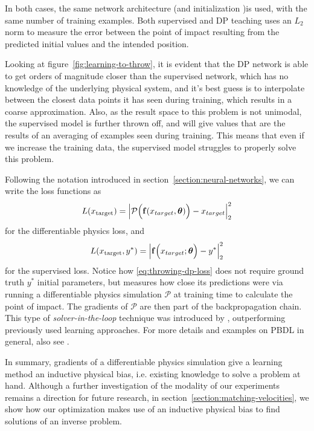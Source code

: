 In both cases, the same network architecture (and initialization )is used, with
the same number of training examples. Both supervised and \ac{DP} teaching uses
an $L_2$ norm to measure the error between the point of impact resulting from
the predicted initial values and the intended position.

Looking at figure~\ref{fig:learning-to-throw}, it is evident that the DP network
is able to get orders of magnitude closer than the supervised network, which has
no knowledge of the underlying physical system, and it's best guess is to
interpolate between the closest data points it has seen during training, which
results in a coarse approximation. Also, as the result space to this problem is
not unimodal, the supervised model is further thrown off, and will give values
that are the results of an averaging of examples seen during training. This
means that even if we increase the training data, the supervised model struggles
to properly solve this problem.  

Following the notation introduced in section~\ref{section:neural-networks}, we
can write the loss functions as
\begin{equation}\label{eq:throwing-dp-loss}
  L(x_{\text{target}}) = 
  \abs{\mathcal{P}\Big(\vb{f}(x_{target},\boldsymbol{\theta})\Big) - x_{target}}_2^2
\end{equation}
for the differentiable physics loss, and 
\begin{equation}\label{eq:throwing-supervised-loss}
  L(x_{\text{target}}, y^*) = 
  \abs{\vb{f}\Big(x_{target};\boldsymbol{\theta}\Big)-y^*}_2^2
\end{equation}
for the supervised loss. Notice how \eqref{eq:throwing-dp-loss} does not require
ground truth $y^*$ initial parameters, but measures how close its predictions
were via running a differentiable physics simulation $\mathcal{P}$ at training
time to calculate the point of impact. The gradients of $\mathcal{P}$ are then
part of the backpropagation chain. This type of \textit{solver-in-the-loop}
technique was introduced by \cite{solver-in-the-loop}, outperforming previously
used learning approaches. For more details and examples on \acf{PBDL} in general,
also see \cite{pbdl}.

In summary, gradients of a differentiable physics simulation give a learning
method an inductive physical bias, i.e. existing knowledge to solve a problem at
hand. Although a further investigation of the modality of our experiments
remains a direction for future research, in
section~\ref{section:matching-velocities}, we show how our optimization makes
use of an inductive physical bias to find solutions of an inverse problem.


